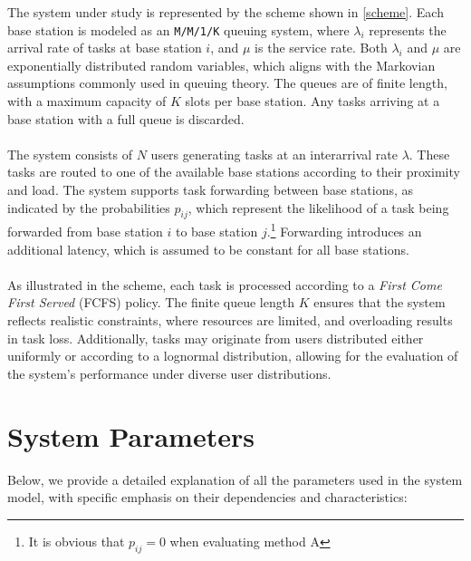 \documentclass{report}
\begin{document}
The system under study is represented by the scheme shown in \autoref{scheme}. Each base station is modeled as an \texttt{M/M/1/K} queuing system, where $\lambda_i$ represents the arrival rate of tasks at base station $i$, and $\mu$ is the service rate.
Both $\lambda_i$ and $\mu$ are exponentially distributed random variables, which aligns with the Markovian assumptions commonly used in queuing theory.
The queues are of finite length, with a maximum capacity of $K$ slots per base station. Any tasks arriving at a base station with a full queue is discarded.\\\\
The system consists of $N$ users generating tasks at an interarrival rate $\lambda$. These tasks are routed to one of the available base stations according to their proximity and load.
The system supports task forwarding between base stations, as indicated by the probabilities $p_{ij}$, which represent the likelihood of a task being forwarded from base station $i$ to base station $j$.\footnote{It is obvious that $p_{ij}=0$ when evaluating method A}
Forwarding introduces an additional latency, which is assumed to be constant for all base stations.\\\\
As illustrated in the scheme, each task is processed according to a \textit{First Come First Served} (FCFS) policy. 
The finite queue length $K$ ensures that the system reflects realistic constraints, where resources are limited, and overloading results in task loss.
Additionally, tasks may originate from users distributed either uniformly or according to a lognormal distribution, allowing for the evaluation of the system's performance under diverse user distributions.

\section{System Parameters}
Below, we provide a detailed explanation of all the parameters used in the system model, with specific emphasis on their dependencies and characteristics:
\end{document}
